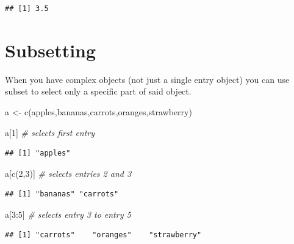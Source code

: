 \documentclass[
]{book}
\newenvironment{Shaded}{\begin{snugshade}}{\end{snugshade}}
\newcommand{\CommentTok}[1]{\textcolor[rgb]{0.56,0.35,0.01}{\textit{#1}}}
\newcommand{\DecValTok}[1]{\textcolor[rgb]{0.00,0.00,0.81}{#1}}
\newcommand{\FunctionTok}[1]{\textcolor[rgb]{0.00,0.00,0.00}{#1}}
\newcommand{\NormalTok}[1]{#1}
\newcommand{\OtherTok}[1]{\textcolor[rgb]{0.56,0.35,0.01}{#1}}
\newcommand{\SpecialCharTok}[1]{\textcolor[rgb]{0.00,0.00,0.00}{#1}}
\newcommand{\StringTok}[1]{\textcolor[rgb]{0.31,0.60,0.02}{#1}}
\begin{document}
\begin{verbatim}
## [1] 3.5
\end{verbatim}

\hypertarget{subsetting}{%
\section{Subsetting}\label{subsetting}}

When you have complex objects (not just a single entry object) you can use subset to select only a specific part of said object.

\begin{Shaded}
\begin{Highlighting}[]
\NormalTok{a }\OtherTok{\textless{}{-}} \FunctionTok{c}\NormalTok{(}\StringTok{\textquotesingle{}apples\textquotesingle{}}\NormalTok{,}\StringTok{\textquotesingle{}bananas\textquotesingle{}}\NormalTok{,}\StringTok{\textquotesingle{}carrots\textquotesingle{}}\NormalTok{,}\StringTok{\textquotesingle{}oranges\textquotesingle{}}\NormalTok{,}\StringTok{\textquotesingle{}strawberry\textquotesingle{}}\NormalTok{)}

\NormalTok{a[}\DecValTok{1}\NormalTok{]   }\CommentTok{\# selects first entry}
\end{Highlighting}
\end{Shaded}

\begin{verbatim}
## [1] "apples"
\end{verbatim}

\begin{Shaded}
\begin{Highlighting}[]
\NormalTok{a[}\FunctionTok{c}\NormalTok{(}\DecValTok{2}\NormalTok{,}\DecValTok{3}\NormalTok{)]  }\CommentTok{\# selects entries 2 and 3}
\end{Highlighting}
\end{Shaded}

\begin{verbatim}
## [1] "bananas" "carrots"
\end{verbatim}

\begin{Shaded}
\begin{Highlighting}[]
\NormalTok{a[}\DecValTok{3}\SpecialCharTok{:}\DecValTok{5}\NormalTok{]  }\CommentTok{\# selects entry 3 to entry 5}
\end{Highlighting}
\end{Shaded}

\begin{verbatim}
## [1] "carrots"    "oranges"    "strawberry"
\end{verbatim}
\end{document}
